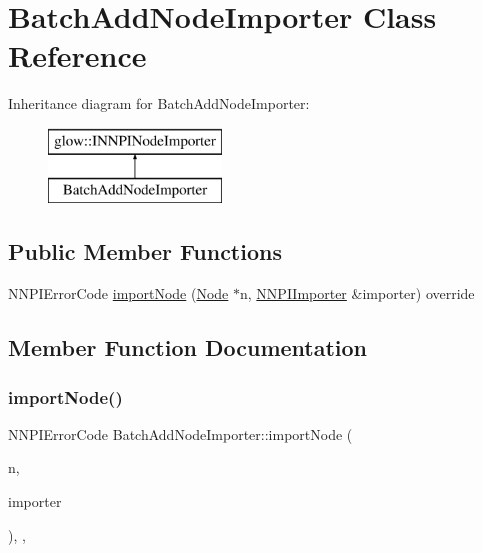 \hypertarget{class_batch_add_node_importer}{}\section{Batch\+Add\+Node\+Importer Class Reference}
\label{class_batch_add_node_importer}
Inheritance diagram for Batch\+Add\+Node\+Importer\+:\begin{figure}[H]
\begin{center}
\leavevmode
\includegraphics[height=2.000000cm]{class_batch_add_node_importer}
\end{center}
\end{figure}
\subsection*{Public Member Functions}
\begin{DoxyCompactItemize}
\item 
N\+N\+P\+I\+Error\+Code \hyperlink{class_batch_add_node_importer_a466e6d50671caecbcfc97fffd2e70e7c}{import\+Node} (\hyperlink{classglow_1_1_node}{Node} $\ast$n, \hyperlink{classglow_1_1_n_n_p_i_importer}{N\+N\+P\+I\+Importer} \&importer) override
\end{DoxyCompactItemize}


\subsection{Member Function Documentation}
\mbox{\label{class_batch_add_node_importer_a466e6d50671caecbcfc97fffd2e70e7c}} 
\subsubsection{\texorpdfstring{import\+Node()}{importNode()}}
{\footnotesize\ttfamily N\+N\+P\+I\+Error\+Code Batch\+Add\+Node\+Importer\+::import\+Node (\begin{DoxyParamCaption}\item[{\hyperlink{classglow_1_1_node}{Node} $\ast$}]{n,  }\item[{\hyperlink{classglow_1_1_n_n_p_i_importer}{N\+N\+P\+I\+Importer} \&}]{importer }\end{DoxyParamCaption})\hspace{0.3cm}{\ttfamily [inline]}, {\ttfamily [override]}, {\ttfamily [virtual]}}


